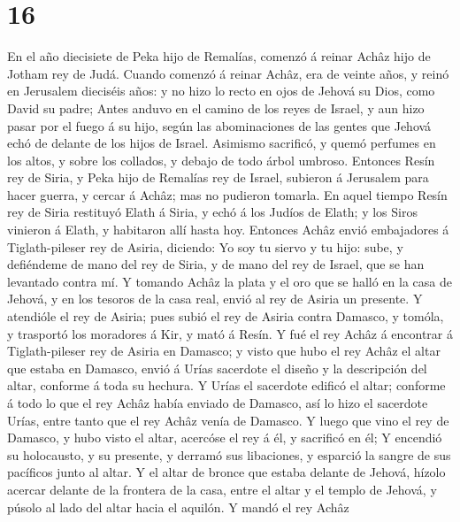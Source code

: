 \hypertarget{section-15}{%
\section{16}\label{section-15}}

 En el año diecisiete de Peka hijo de Remalías, comenzó á
reinar Achâz hijo de Jotham rey de Judá.  Cuando comenzó á
reinar Achâz, era de veinte años, y reinó en Jerusalem dieciséis años: y
no hizo lo recto en ojos de Jehová su Dios, como David su padre;
 Antes anduvo en el camino de los reyes de Israel, y aun
hizo pasar por el fuego á su hijo, según las abominaciones de las gentes
que Jehová echó de delante de los hijos de Israel. 
Asimismo sacrificó, y quemó perfumes en los altos, y sobre los collados,
y debajo de todo árbol umbroso.  Entonces Resín rey de
Siria, y Peka hijo de Remalías rey de Israel, subieron á Jerusalem para
hacer guerra, y cercar á Achâz; mas no pudieron tomarla. 
En aquel tiempo Resín rey de Siria restituyó Elath á Siria, y echó á los
Judíos de Elath; y los Siros vinieron á Elath, y habitaron allí hasta
hoy.  Entonces Achâz envió embajadores á Tiglath-pileser
rey de Asiria, diciendo: Yo soy tu siervo y tu hijo: sube, y defiéndeme
de mano del rey de Siria, y de mano del rey de Israel, que se han
levantado contra mí.  Y tomando Achâz la plata y el oro
que se halló en la casa de Jehová, y en los tesoros de la casa real,
envió al rey de Asiria un presente.  Y atendióle el rey de
Asiria; pues subió el rey de Asiria contra Damasco, y tomóla, y
trasportó los moradores á Kir, y mató á Resín.  Y fué el
rey Achâz á encontrar á Tiglath-pileser rey de Asiria en Damasco; y
visto que hubo el rey Achâz el altar que estaba en Damasco, envió á
Urías sacerdote el diseño y la descripción del altar, conforme á toda su
hechura.  Y Urías el sacerdote edificó el altar; conforme
á todo lo que el rey Achâz había enviado de Damasco, así lo hizo el
sacerdote Urías, entre tanto que el rey Achâz venía de Damasco.
 Y luego que vino el rey de Damasco, y hubo visto el
altar, acercóse el rey á él, y sacrificó en él;  Y
encendió su holocausto, y su presente, y derramó sus libaciones, y
esparció la sangre de sus pacíficos junto al altar.  Y el
altar de bronce que estaba delante de Jehová, hízolo acercar delante de
la frontera de la casa, entre el altar y el templo de Jehová, y púsolo
al lado del altar hacia el aquilón.  Y mandó el rey Achâz
